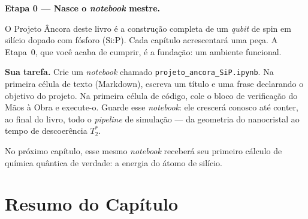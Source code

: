 \documentclass[11pt,a4paper,openany]{book}
\newcommand{\code}[1]{\texttt{#1}}
\newcommand{\qubit}{\emph{qubit}}
\begin{document}
\begin{caixaancora}
\textbf{Etapa 0 --- Nasce o \emph{notebook} mestre.}

O Projeto Âncora deste livro é a construção completa de um \qubit{} de spin em
silício dopado com fósforo (Si:P). Cada capítulo acrescentará uma peça. A
Etapa~0, que você acaba de cumprir, é a fundação: um ambiente funcional.

\vspace{0.3cm}
\textbf{Sua tarefa.} Crie um \emph{notebook} chamado
\code{projeto\_ancora\_SiP.ipynb}. Na primeira célula de texto (Markdown), escreva
um título e uma frase declarando o objetivo do projeto. Na primeira célula de
código, cole o bloco de verificação do Mãos à Obra e execute-o. Guarde esse
\emph{notebook}: ele crescerá conosco até conter, ao final do livro, todo o
\emph{pipeline} de simulação --- da geometria do nanocristal ao tempo de
descoerência $T_2^\ast$.

\vspace{0.3cm}
No próximo capítulo, esse mesmo \emph{notebook} receberá seu primeiro cálculo de
química quântica de verdade: a energia do átomo de silício.
\end{caixaancora}

\section*{Resumo do Capítulo}
\end{document}
